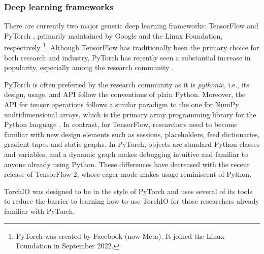 \subsubsection{Deep learning frameworks}
\label{sec:frameworks}

There are currently two major generic deep learning frameworks: TensorFlow \cite{abadi_tensorflow_2016} and PyTorch \cite{paszke_pytorch_2019}, primarily maintained by Google and the Linux Foundation, respectively%
\footnote{PyTorch was created by Facebook (now Meta). It joined the Linux Foundation in September 2022.}.
Although TensorFlow has traditionally been the primary choice for both research and industry, PyTorch has recently seen a substantial increase in popularity, especially among the research community \cite{he_state_2019}.

PyTorch is often preferred by the research community as it is \textit{pythonic}, i.e., its design, usage, and \ac{API} follow the conventions of plain Python. Moreover, the \ac{API} for tensor operations follows a similar paradigm to the one for NumPy multidimensional arrays, which is the primary array programming library for the Python language \cite{van_der_walt_numpy_2011}.
In contrast, for TensorFlow, researchers need to become familiar with new design elements such as sessions, placeholders, feed dictionaries, gradient tapes and static graphs.
In PyTorch, objects are standard Python classes and variables, and a dynamic graph makes debugging intuitive and familiar to anyone already using Python.
These differences have decreased with the recent release of TensorFlow 2, whose eager mode makes usage reminiscent of Python.

TorchIO was designed to be in the style of PyTorch and uses several of its tools to reduce the barrier to learning how to use TorchIO for those researchers already familiar with PyTorch.
